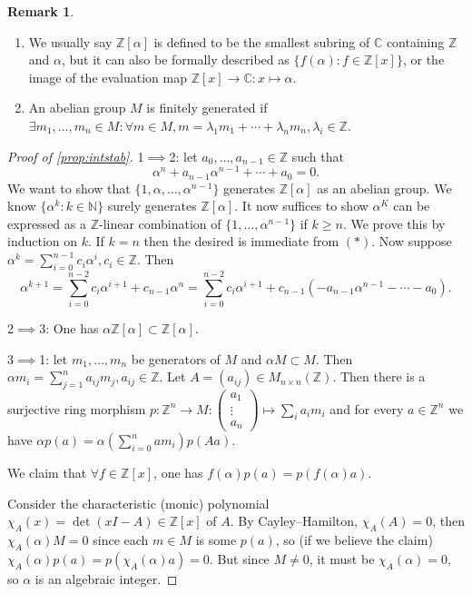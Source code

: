 \documentclass{article}
\newcommand{\N}{\mathbb{N}}
\newcommand{\Z}{\mathbb{Z}}
\newcommand{\C}{\mathbb{C}}
\theoremstyle{definition}
\newtheorem{remark}[defn]{Remark}
\begin{document}
\begin{remark}
\begin{enumerate}
\item We usually say $\Z[\alpha]$ is defined to be the smallest subring of $\C$ containing $\Z$ and $\alpha$, but it can also be formally described as $\{f(\alpha):f\in\Z[x]\}$, or the image of the evaluation map $\Z[x]\rightarrow\C:x\mapsto\alpha$.
\item An abelian group $M$ is finitely generated if $\exists m_1,\ldots,m_n\in M:\forall m\in M,m=\lambda_1m_1+\cdots+\lambda_nm_n,\lambda_i\in\Z$.
\end{enumerate}
\end{remark}

\begin{proof}[Proof of \ref{prop:intstab}]
1$\implies$2: let $a_0,\ldots,a_{n-1}\in\Z$ such that
\[
\tag{\ast}
\alpha^n+a_{n-1}\alpha^{n-1}+\cdots+a_0=0.
\]
We want to show that $\{1,\alpha,\ldots,\alpha^{n-1}\}$ generates $\Z[\alpha]$ as an abelian group. We know $\{\alpha^k:k\in\N\}$ surely generates $\Z[\alpha]$. It now suffices to show $\alpha^K$ can be expressed as a $\Z$-linear combination of $\{1,\ldots,\alpha^{n-1}\}$ if $k\geq n$. We prove this by induction on $k$. If $k=n$ then the desired is immediate from $(\ast)$. Now suppose $\alpha^k=\sum_{i=0}^{n-1}c_i \alpha^i,c_i\in\Z$. Then
\[
\alpha^{k+1}=\sum_{i=0}^{n-2}c_i\alpha^{i+1}+c_{n-1}\alpha^n=\sum_{i=0}^{n-2}c_i\alpha^{i+1}+c_{n-1}(-a_{n-1}\alpha^{n-1}-\cdots-a_0).
\]

2$\implies$3: One has $\alpha\Z[\alpha]\subset\Z[\alpha]$.

3$\implies$1: let $m_1,\ldots,m_n$ be generators of $M$ and $\alpha M\subset M$. Then $\alpha m_i=\sum_{j=1}^na_{ij}m_j,a_{ij}\in\Z$. Let $A=(a_{ij})\in M_{n\times n}(\Z)$. Then there is a surjective ring morphism $p:\Z^n\rightarrow M:\begin{pmatrix}
a_1\\ \vdots \\ a_n
\end{pmatrix}\mapsto\sum_i a_im_i$ and for every $a\in\Z^n$ we have $\alpha p(a)=\alpha\left(\sum_{i=0}^n am_i\right)p(Aa)$.

We claim that $\forall f\in\Z[x]$, one has $f(\alpha)p(a)=p(f(\alpha)a)$.

Consider the characteristic (monic) polynomial $\chi_A(x)=\det(xI-A)\in\Z[x]$ of $A$. By Cayley--Hamilton, $\chi_A(A)=0$, then $\chi_A(\alpha) M=0$ since each $m\in M$ is some $p(a)$, so (if we believe the claim) $\chi_A(\alpha)p(a)=p(\chi_A(\alpha)a)=0$. But since $M\neq 0$, it must be $\chi_A(\alpha)=0$, so $\alpha$ is an algebraic integer.


\end{proof}
\end{document}

